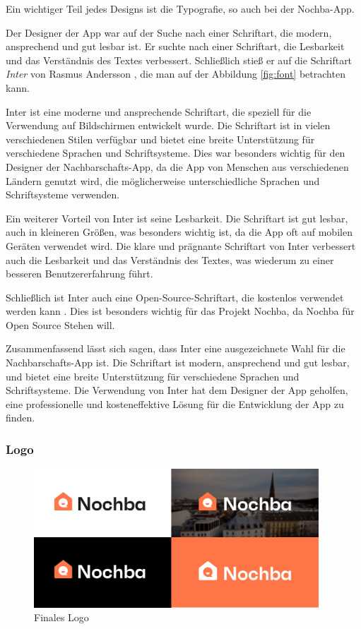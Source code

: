 Ein wichtiger Teil jedes Designs ist die Typografie, so auch bei der Nochba-App.

Der Designer der App war auf der Suche nach einer
Schriftart, die modern, ansprechend und gut lesbar ist. Er
suchte nach einer Schriftart, die Lesbarkeit und das
Verständnis des Textes verbessert. Schließlich stieß er auf
die Schriftart \textit{Inter} von Rasmus Andersson
\cite{inter-font}, die man auf der Abbildung \ref{fig:font}
betrachten kann.

Inter ist eine moderne und ansprechende Schriftart, die speziell für die Verwendung auf Bildschirmen entwickelt wurde. Die Schriftart ist in vielen verschiedenen Stilen verfügbar und bietet eine breite Unterstützung für verschiedene Sprachen und Schriftsysteme. Dies war besonders wichtig für den Designer der Nachbarschafts-App, da die App von Menschen aus verschiedenen Ländern genutzt wird, die möglicherweise unterschiedliche Sprachen und Schriftsysteme verwenden.

Ein weiterer Vorteil von Inter ist seine Lesbarkeit. Die Schriftart ist gut lesbar, auch in kleineren Größen, was besonders wichtig ist, da die App oft auf mobilen Geräten verwendet wird. Die klare und prägnante Schriftart von Inter verbessert auch die Lesbarkeit und das Verständnis des Textes, was wiederum zu einer besseren Benutzererfahrung führt.

Schließlich ist Inter auch eine Open-Source-Schriftart, die kostenlos verwendet werden kann \cite{inter-font}. Dies ist besonders wichtig für das Projekt Nochba, da Nochba für Open Source Stehen will.

Zusammenfassend lässt sich sagen, dass Inter eine ausgezeichnete Wahl für die Nachbarschafts-App ist. Die Schriftart ist modern, ansprechend und gut lesbar, und bietet eine breite Unterstützung für verschiedene Sprachen und Schriftsysteme. Die Verwendung von Inter hat dem Designer der App geholfen, eine professionelle und kosteneffektive Lösung für die Entwicklung der App zu finden.
\subsubsection{Logo}

\begin{figure}[H]
  \centering
  \includegraphics[width=0.95\textwidth]{pics/final-logo.png}
  \caption{Finales Logo}
  \label{fig:final-logo}
\end{figure}

